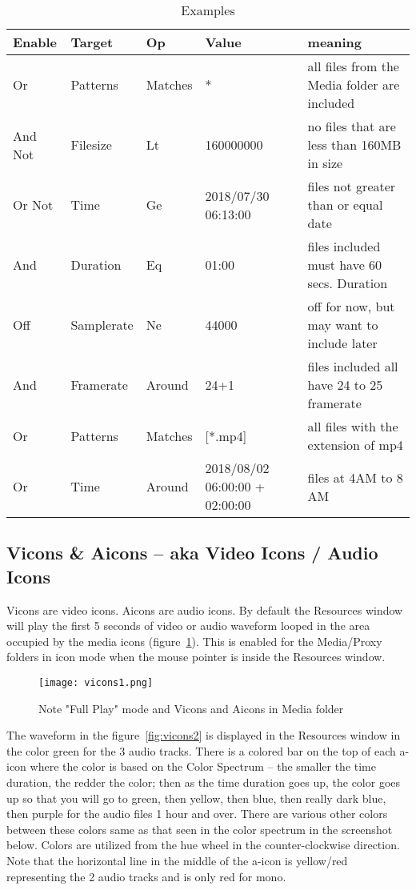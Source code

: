 \begin{table}[htpb]
    \centering
    \caption{Examples}
    \label{tab:label}
    \small
    \begin{tabular}{llllm{10em}} \toprule
        Enable&	Target&	Op&	Value&	meaning\\\midrule
Or	&Patterns  &Matches   &*&	 all files from the Media folder are included\\
And Not&Filesize&Lt	&160000000& no files that are less than 160MB in size \\
Or Not&	Time	&Ge	&2018/07/30 06:13:00	& files not greater than or equal date\\
And	&Duration&Eq	&01:00		& files included must have 60 secs. Duration\\
Off	&Samplerate&Ne	&44000		& off for now, but may want to include later\\
And	&Framerate&Around&24+1		& files included all have 24 to 25 framerate\\
Or	&Patterns&Matches&[*.mp4]	& all files with the extension of mp4\\
Or	&Time&	Around&2018/08/02 06:00:00 + 02:00:00  & files at 4AM to 8 AM\\\bottomrule
    \end{tabular}
\end{table}


\subsection{Vicons \& Aicons – aka Video Icons / Audio Icons}%
\label{sub:vicons_aicons_aka_video_icons_audio_icons}

Vicons are video icons.  
Aicons are audio icons.  
By default the Resources window will play the first 5 seconds of video or audio waveform looped in the area occupied by the media icons (figure~\ref{fig:vicons1}). 
This is enabled for the Media/Proxy folders in icon mode when the mouse pointer is inside the Resources window. 

\begin{figure}[htpb]
    \centering
    \texttt{[image: vicons1.png]}
    \caption{Note "Full Play" mode and Vicons and Aicons in Media folder}
    \label{fig:vicons1}
\end{figure}

The waveform in the figure~\ref{fig:vicons2} is displayed in the Resources window in the color green for the 3 audio tracks. 
There is a colored bar on the top of each a-icon where the color is based on the Color Spectrum -- the smaller the time duration, the redder the color; then as the time duration goes up, the color goes up so that you will go to green, then yellow, then blue, then really dark blue, then purple for the audio files 1 hour and over.  
There are various other colors between these colors same as that seen in the color spectrum in the screenshot below.  
Colors are utilized from the hue wheel in the counter-clockwise direction.  
Note that the horizontal line in the middle of the a-icon is yellow/red representing the 2 audio tracks and is only red for mono.



